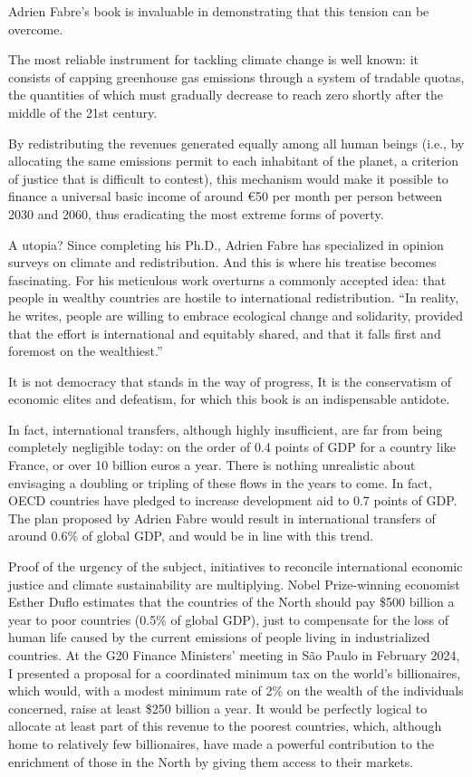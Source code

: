 \documentclass[a5paper,english,openany]{memoir}
\begin{document}
Adrien Fabre's book is invaluable in demonstrating that this tension can be overcome. 

The most reliable instrument for tackling climate change is well known: it consists of capping greenhouse gas emissions through a system of tradable quotas, the quantities of which must gradually decrease to reach zero shortly after the middle of the 21st century. 

By redistributing the revenues generated equally among all human beings (i.e., by allocating the same emissions permit to each inhabitant of the planet, a criterion of justice that is difficult to contest), this mechanism would make it possible to finance a universal basic income of around \euro{}50 per month per person between 2030 and 2060, thus eradicating the most extreme forms of poverty. 

A utopia? Since completing his Ph.D., Adrien Fabre has specialized in opinion surveys on climate and redistribution. And this is where his treatise becomes fascinating. For his meticulous work overturns a commonly accepted idea: that people in wealthy countries are hostile to international redistribution. ``In reality, he writes, people are willing to embrace ecological change and solidarity, provided that the effort is international and equitably shared, and that it falls first and foremost on the wealthiest.''

It is not democracy that stands in the way of progress, It is the conservatism of economic elites and defeatism, for which this book is an indispensable antidote.

In fact, international transfers, although highly insufficient, are far from being completely negligible today: on the order of 0.4 points of GDP for a country like France, or over 10 billion euros a year. There is nothing unrealistic about envisaging a doubling or tripling of these flows in the years to come. In fact, OECD countries have pledged to increase development aid to 0.7 points of GDP. The plan proposed by Adrien Fabre would result in international transfers of around 0.6\% of global GDP, and would be in line with this trend. 

Proof of the urgency of the subject, initiatives to reconcile international economic justice and climate sustainability are multiplying. Nobel Prize-winning economist Esther Duflo estimates that the countries of the North should pay \$500 billion a year to poor countries (0.5\% of global GDP), just to compensate for the loss of human life caused by the current emissions of people living in industrialized countries. At the G20 Finance Ministers' meeting in São Paulo in February 2024, I presented a proposal for a coordinated minimum tax on the world's billionaires, which would, with a modest minimum rate of 2\% on the wealth of the individuals concerned, raise at least \$250 billion a year. It would be perfectly logical to allocate at least part of this revenue to the poorest countries, which, although home to relatively few billionaires, have made a powerful contribution to the enrichment of those in the North by giving them access to their markets. 
\end{document}

